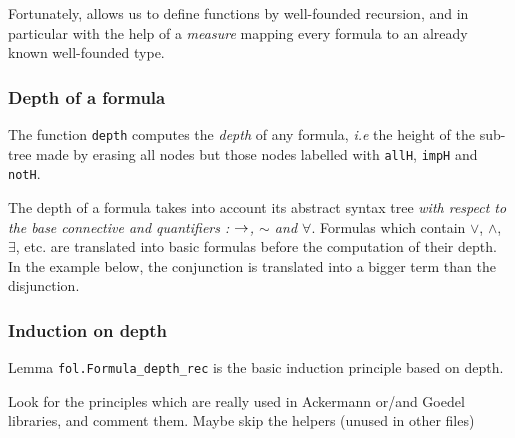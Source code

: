 Fortunately, \coq allows us to define functions by well-founded recursion, and in particular with the help of a \emph{measure} mapping every formula to an already known well-founded type.





\subsubsection{Depth of a formula}

The function \texttt{depth} computes the \emph{depth} of  any formula, \emph{i.e} the height of the sub-tree made
by erasing all nodes but those nodes labelled with
\texttt{allH}, \texttt{impH} and \texttt{notH}.



\begin{remark}
  The depth of a formula takes into account its abstract syntax tree \emph{with respect to the base connective and quantifiers : $\mbox{$\rightarrow$}$, $\sim$ and $\forall$}.
    Formulas which contain $\vee$, $\wedge$, $\exists$, etc. are translated into
    basic formulas before the computation of their depth. In the example below, 
the conjunction is translated into a bigger term than the disjunction.


\end{remark}

\subsubsection{Induction on depth}

Lemma \texttt{fol.Formula\_depth\_rec} is the basic
induction principle based on depth.






\begin{todo}
 Look for the principles which are really used in Ackermann or/and Goedel libraries, and comment them.
 Maybe skip the helpers (unused in other files)
\end{todo}

